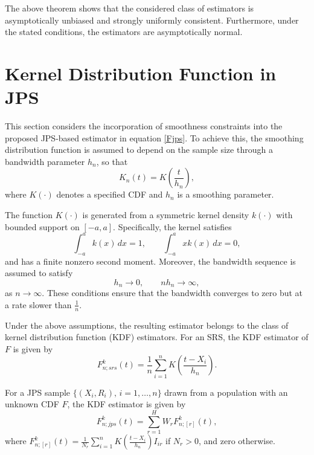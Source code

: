 \documentclass[twoside]{article}
\begin{document}
The above theorem shows that the considered class of estimators is asymptotically unbiased and strongly uniformly consistent. Furthermore, under the stated conditions, the estimators are asymptotically normal.

\section{Kernel Distribution Function in JPS}
This section considers the incorporation of smoothness constraints into the proposed JPS-based estimator in equation \eqref{Fjps}. To achieve this, the smoothing distribution function is assumed to depend on the sample size through a bandwidth parameter $h_n$, so that
\[
K_n(t)=K\left(\frac{t}{h_n}\right),
\]
where $K(\cdot)$ denotes a specified CDF and $h_n$ is a smoothing parameter.

The function $K(\cdot)$ is generated from a symmetric kernel density $k(\cdot)$ with bounded support on $[-a,a]$. Specifically, the kernel satisfies
\[
\int_{-a}^{a} k(x)\,dx = 1,
\qquad
\int_{-a}^{a} xk(x)\,dx = 0,
\]
and has a finite nonzero second moment. Moreover, the bandwidth sequence is assumed to satisfy
\[
h_n \to 0,
\qquad
nh_n \to \infty,
\]
as $n \to \infty$. These conditions ensure that the bandwidth converges to zero but at a rate slower than $\frac{1}{n}$.

Under the above assumptions, the resulting estimator belongs to the class of kernel distribution function (KDF) estimators. For an SRS, the KDF estimator of $F$ is given by
\[
F_{n;srs}^{k}(t)
=
\frac{1}{n}
\sum_{i=1}^{n}
K\left(\frac{t-X_i}{h_n}\right).
\]


For a JPS sample $\{(X_i,R_i),\, i=1,\ldots,n\}$ drawn from a population with an unknown CDF $F$, the  KDF estimator is given by
\begin{equation*}
F^{k}_{n;jps}(t)=\sum_{r=1}^{H} W_r F^{k}_{n;[r]}(t),
\end{equation*}
where ${F}^{k}_{n;[r]} (t)=\frac{1}{N_r}\sum \limits_{i=1}^n K\left(\frac{t-X_i}{h_n}\right) I_{ir}$ if $N_r>0$, and zero otherwise.
\end{document}
